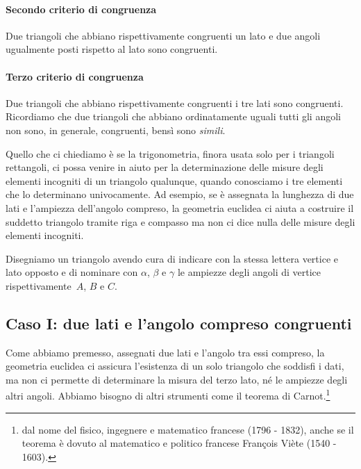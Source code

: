 \paragraph{Secondo criterio di congruenza}
Due triangoli che abbiano rispettivamente congruenti un lato e due
angoli ugualmente posti rispetto al lato sono congruenti.

\paragraph{Terzo criterio di congruenza}
Due triangoli che abbiano rispettivamente congruenti i tre lati sono congruenti.
\\

Ricordiamo che due triangoli che abbiano ordinatamente uguali tutti gli angoli non sono, in generale, congruenti, bensì sono \emph{simili}.

Quello che ci chiediamo è se la trigonometria, finora usata solo per i triangoli rettangoli, ci possa venire in aiuto per la
determinazione delle misure degli elementi incogniti di un triangolo qualunque, quando conosciamo i tre elementi che lo
determinano univocamente. Ad esempio, se è assegnata la lunghezza di due lati e l'ampiezza dell'angolo compreso,
la geometria euclidea ci aiuta a costruire il suddetto triangolo tramite riga e compasso ma non ci dice nulla delle
misure degli elementi incogniti.

Disegniamo un triangolo avendo cura di indicare con la stessa lettera vertice e lato opposto e di nominare con
$\alpha$, $\beta$ e $\gamma$ le ampiezze degli angoli di vertice rispettivamente~$A$, $B$ e $C$.
\begin{center}
 
\end{center}

\subsection{Caso I: due lati e l'angolo compreso congruenti}

Come abbiamo premesso, assegnati due lati e l'angolo tra essi compreso, la geometria euclidea ci assicura l'esistenza
di un solo triangolo che soddisfi i dati, ma non ci permette di determinare la misura del terzo lato, né le ampiezze degli altri angoli.
Abbiamo bisogno di altri strumenti come il teorema di Carnot.\footnote{dal nome del fisico, ingegnere e matematico francese (1796 - 1832), anche se il teorema è dovuto al matematico e politico francese François Viète (1540 - 1603).}

